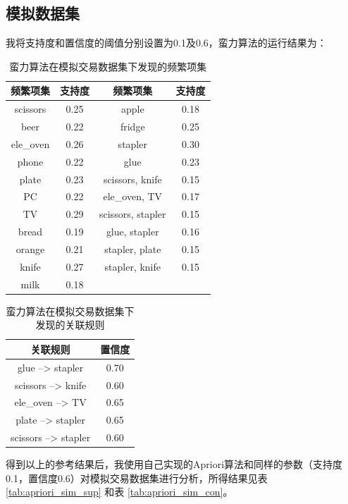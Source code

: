 \documentclass[12pt,a4paper]{article}
\theoremstyle{definition}
\begin{document}
\subsection{模拟数据集}

我将支持度和置信度的阈值分别设置为0.1及0.6，蛮力算法的运行结果为：

\begin{table}[H]
	\renewcommand\arraystretch{1.35}
	\caption{蛮力算法在模拟交易数据集下发现的频繁项集}
	\label{tab:baoli_sim_sup}
	\centering
	
	\begin{tabular}{c|c|c|c}
		\centering
		频繁项集 & 支持度 & 频繁项集 & 支持度 \\
		\hline
		scissors & 0.25 & apple & 0.18 \\
		beer & 0.22 & fridge & 0.25 \\
		ele\_oven & 0.26 & stapler & 0.30 \\
		phone & 0.22 & glue & 0.23 \\
		plate & 0.23 & scissors, knife & 0.15 \\
		PC & 0.22 & ele\_oven, TV & 0.17 \\
		TV & 0.29 & scissors, stapler & 0.15 \\
		bread & 0.19 & glue, stapler & 0.16 \\
		orange & 0.21 & stapler, plate & 0.15 \\
		knife & 0.27 & stapler, knife & 0.15 \\
		milk & 0.18 & & \\		
	\end{tabular}
\end{table}

\begin{table}[H]
	\renewcommand\arraystretch{1.35}
	\caption{蛮力算法在模拟交易数据集下发现的关联规则}
	\label{tab:baoli_sim_con}
	\centering
	
	\begin{tabular}{c|c}
		\centering
		关联规则 & 置信度 \\
		\hline
		glue --> stapler & 0.70 \\
		scissors --> knife & 0.60 \\
		ele\_oven --> TV & 0.65 \\
		plate --> stapler & 0.65 \\
		scissors --> stapler & 0.60 \\
	\end{tabular}
\end{table}

得到以上的参考结果后，我使用自己实现的Apriori算法和同样的参数（支持度0.1，置信度0.6）对模拟交易数据集进行分析，所得结果见表 \ref{tab:apriori_sim_sup} 和表 \ref{tab:apriori_sim_con}。
\end{document}
